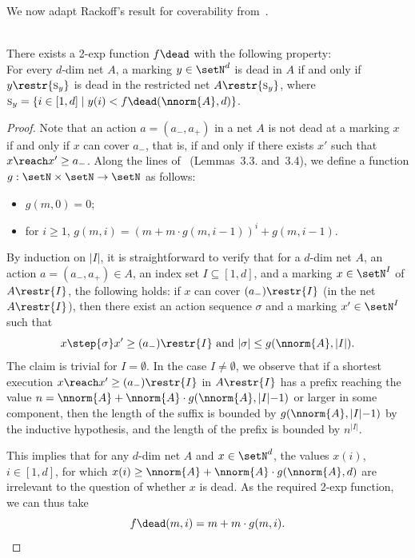 \noindent
We now adapt Rackoff's result for coverability
from~\cite{DBLP:journals/tcs/Rackoff78}.
\begin{lem}\label{lem:rackoffdead}
\hfill\\
	There exists a 2-exp function $f\dead$ with the following property:
\\
For every
$d$-dim net $A$, a marking $y\in\setN^d$ is dead in $A$ if and only if 
 $y\restr{\textsc{s}_y}$ is dead in the restricted net
	$A\restr{\textsc{s}_y}$,
	where $\textsc{s}_y=\{i\in [1,d]\mid
y(i)<f\dead(\nnorm{A},d)\}$.
\end{lem}
\begin{proof}
Note that an action $a=(a_-,a_+)$ in a net $A$
	is not dead
	at a marking $x$ if and only if $x$ can cover $a_-$, that is, 
	if and only if there exists $x'$ such that $x\reach x'\geq a_-$.
	Along the lines of~\cite{DBLP:journals/tcs/Rackoff78}
	(Lemmas~3.3. and~3.4), we define a function
	$g:\setN\times\setN\to\setN$ as follows:
\begin{itemize}
	\item			
 $g(m,0)=0$;
\item
	for $i\geq 1$,	$g(m,i)= (m + m\cdot g(m,i{-}1))^{i}+g(m,i{-}1)$.
\end{itemize}		

	\noindent
	By induction on $|I|$, it is straightforward to verify that 
	for a $d$-dim net $A$, 
an action $a=(a_-,a_+)\in A$, an index set $I\subseteq [1,d]$, and a
	marking
	$x\in\setN^I$ of $A\restr{I}$, the following holds: if  $x$ can cover
	$(a_-)\restr{I}$ (in the net $A\restr{I}$), then 
there exist an action sequence $\sigma$ and a marking $x'\in\setN^I$ such that 
	\begin{equation*}
		x\step{\sigma}x'\geq (a_-)\restr{I}\text{ and }|\sigma|\leq
	g(\nnorm{A},|I|). 
	\end{equation*}
The claim is trivial for $I=\emptyset$.	In the case $I\neq\emptyset$,
we observe that 
if a shortest execution  $x\reach x'\geq (a_-)\restr{I}$ in
	$A\restr{I}$
	 has a prefix
	reaching the value $n=\nnorm{A} + \nnorm{A}\cdot
	g(\nnorm{A},|I|{-}1)$ or larger in some
	component, then the length of the suffix is bounded
	by $g(\nnorm{A},|I|{-}1)$ by the inductive hypothesis, and the
	length of the prefix is bounded by $n^{|I|}$.

This implies that for any $d$-dim net $A$ and $x\in\setN^d$, 
the values
	$x(i)$, $i\in[1,d]$, for which  
	$x(i)\geq \nnorm{A}+\nnorm{A}\cdot g(\nnorm{A},d)$ are
	irrelevant to 
	the question of whether $x$ is dead. 
As the required 2-exp function, we can thus take
	\[f\dead(m,i)=m+m\cdot g(m,i).\qedhere\] 
\end{proof}	

